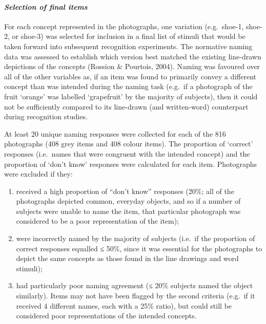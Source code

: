 \documentclass[
  11pt,
]{article}
\providecommand{\tightlist}{%
  \setlength{\itemsep}{0pt}\setlength{\parskip}{0pt}}
\begin{document}
\hypertarget{selection-of-final-items}{%
\paragraph{\texorpdfstring{\emph{Selection of final
items}}{Selection of final items}}\label{selection-of-final-items}}

For each concept represented in the photographs, one variation
(e.g.~shoe-1, shoe-2, or shoe-3) was selected for inclusion in a final
list of stimuli that would be taken forward into subsequent recognition
experiments. The normative naming data was assessed to establish which
version best matched the existing line-drawn depictions of the concepts
(Rossion \& Pourtois, 2004). Naming was favoured over all of the other
variables as, if an item was found to primarily convey a different
concept than was intended during the naming task (e.g.~if a photograph
of the fruit `orange' was labelled `grapefruit' by the majority of
subjects), then it could not be sufficiently compared to its line-drawn
(and written-word) counterpart during recognition studies.

At least 20 unique naming responses were collected for each of the 816
photographs (408 grey items and 408 colour items). The proportion of
`correct' responses (i.e.~names that were congruent with the intended
concept) and the proportion of `don't know' responses were calculated
for each item. Photographs were excluded if they:

\begin{enumerate}
\def\labelenumi{\arabic{enumi}.}
\tightlist
\item
  received a high proportion of ``don't know'' responses (20\%; all of
  the photographs depicted common, everyday objects, and so if a number
  of subjects were unable to name the item, that particular photograph
  was considered to be a poor representation of the item);
\item
  were incorrectly named by the majority of subjects (i.e.~if the
  proportion of correct responses equalled ≤ 50\%, since it was
  essential for the photographs to depict the same concepts as those
  found in the line drawings and word stimuli);
\item
  had particularly poor naming agreement (≤ 20\% subjects named the
  object similarly). Items may not have been flagged by the second
  criteria (e.g.~if it received 4 different names, each with a 25\%
  ratio), but could still be considered poor representations of the
  intended concepts.
\end{enumerate}
\end{document}

